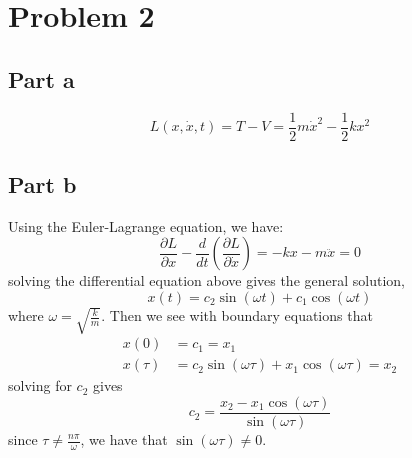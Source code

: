 \documentclass[12pt]{report}
\begin{document}
\section*{Problem 2}
\subsection*{Part a}
\begin{equation*}
  L(x, \dot{x}, t) = T - V = \frac{1}{2}m\dot{x}^2 - \frac{1}{2}kx^2
\end{equation*}
\subsection*{Part b}
Using the Euler-Lagrange equation, we have:
\begin{equation*}
  \frac{\partial L}{\partial x} - \frac{d}{dt}\left(\frac{\partial L}{\partial \dot{x}}\right) = -kx - m \ddot{x} = 0
\end{equation*}
solving the differential equation above gives the general solution,
\begin{equation*}
  x(t) = c_2 \sin\left(\omega t\right) + c_1 \cos\left(\omega t\right)
\end{equation*}
where $\omega = \sqrt{\frac{k}{m}}$. Then we see with boundary equations that
\begin{align*}
  x(0) &= c_1 = x_1 \\
  x(\tau) &= c_2 \sin\left(\omega \tau\right) + x_1 \cos\left(\omega \tau\right) = x_2
\end{align*}
solving for $c_2$ gives
\begin{equation*}
  c_2 = \frac{x_2 - x_1 \cos\left(\omega \tau\right)}{\sin\left(\omega \tau\right)}
\end{equation*}
since $\tau \neq \frac{n\pi}{\omega}$, we have that $\sin(\omega \tau) \neq 0$. 
\end{document}
